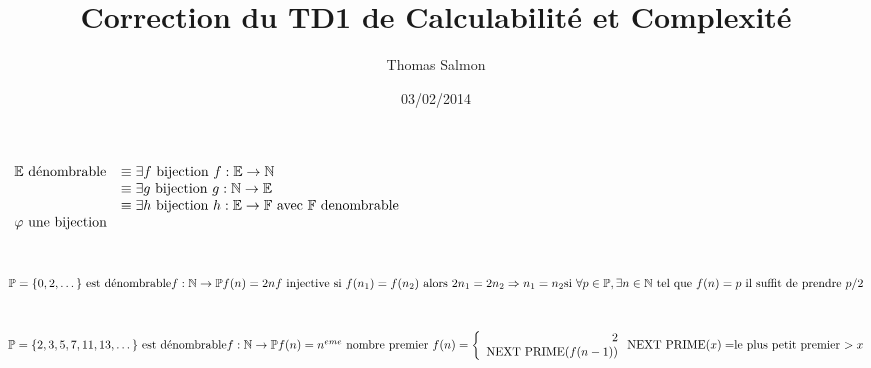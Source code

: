\documentclass[a4paper]{article}
\title{Correction du TD1 de Calculabilité et Complexité}
\author{Thomas Salmon}
\date{03/02/2014}
\begin{document}
\maketitle

\begin{math}
  \begin{array}{ll}
    \mathbb{E} $ dénombrable$
    &\equiv \exists f $ bijection $ f:\mathbb{E} \rightarrow \mathbb{N}\\
    &\equiv \exists g $ bijection $ g:\mathbb{N} \rightarrow \mathbb{E}\\
    &\equiv \exists h $ bijection $ h:\mathbb{E} \rightarrow \mathbb{F} $ avec $ \mathbb{F} $ denombrable $ \\
    \varphi $ une bijection$\\
  \end{array} 
\end{math}

\section{}
\begin{math}
  \mathbb{P} = \{0, 2, \dots \} $ est dénombrable$ \\
  f:\mathbb{N}\rightarrow \mathbb{P}\\
  f(n)=2n \\
  f $ injective si $ f(n_1) = f(n_2) $ alors $ 2n_1 = 2n_2 \Rightarrow n_1 = n_2\\
  $si $ \forall p \in \mathbb{P} , \exists n \in \mathbb{N} $ tel que $ f(n) = p $ il suffit de prendre $ p/2 
\end{math}

\section{}
\begin{math}
  \mathbb{P} = \{2, 3, 5, 7, 11, 13, \dots \} $ est dénombrable$ \\
  f:\mathbb{N}\rightarrow \mathbb{P} \\
  f(n) = n^{eme} $ nombre premier $  \\ 
  f(n) =
  \left\{
  \begin{array}{rcr}
    2 \\
    $NEXT PRIME$(f(n-1))\\
  \end{array}
  \right.\\
  $NEXT PRIME$(x) = $le plus petit premier  $ > x
\end{math}
\end{document}
